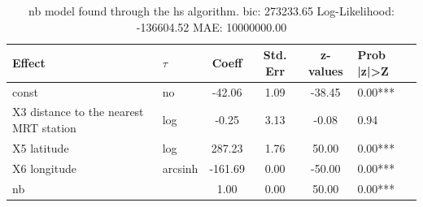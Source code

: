 \begin{table}
	\caption{nb model found through the hs algorithm. bic: 273233.65 Log-Likelihood: -136604.52 MAE: 10000000.00}
	\begin{center}
		\begin{tabular}{|l|l|c|c|c|l|}
			\hline
			Effect & $\tau$ & Coeff & Std. Err & z-values & Prob |z|>Z \\
			\hline
			const & no & -42.06 & 1.09 & -38.45 & 0.00*** \\
			\hline
			X3 distance to the nearest MRT station & log & -0.25 & 3.13 & -0.08 & 0.94 \\
			\hline
			X5 latitude & log & 287.23 & 1.76 & 50.00 & 0.00*** \\
			\hline
			X6 longitude & arcsinh & -161.69 & 0.00 & -50.00 & 0.00*** \\
			\hline
			nb &  & 1.00 & 0.00 & 50.00 & 0.00*** \\
			\hline
		\end{tabular}
	\end{center}
\end{table}